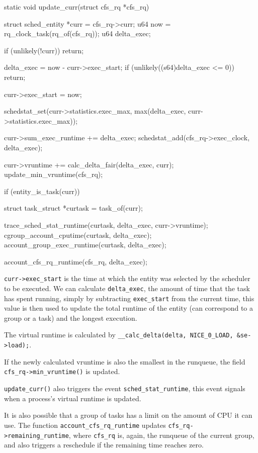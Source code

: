 \documentclass[10pt]{book}
\begin{document}
\begin{code}
static void update_curr(struct cfs_rq *cfs_rq)
{
	struct sched_entity *curr = cfs_rq->curr;
	u64 now = rq_clock_task(rq_of(cfs_rq));
	u64 delta_exec;

	if (unlikely(!curr))
		return;

	delta_exec = now - curr->exec_start;
	if (unlikely((s64)delta_exec <= 0))
		return;

	curr->exec_start = now;

	schedstat_set(curr->statistics.exec_max,
		      max(delta_exec, curr->statistics.exec_max));

	curr->sum_exec_runtime += delta_exec;
	schedstat_add(cfs_rq->exec_clock, delta_exec);

	curr->vruntime += calc_delta_fair(delta_exec, curr);
	update_min_vruntime(cfs_rq);

	if (entity_is_task(curr)) {
		struct task_struct *curtask = task_of(curr);

		trace_sched_stat_runtime(curtask, delta_exec, curr->vruntime);
		cgroup_account_cputime(curtask, delta_exec);
		account_group_exec_runtime(curtask, delta_exec);
	}

	account_cfs_rq_runtime(cfs_rq, delta_exec);
}
\end{code}

\verb|curr->exec_start| is the time at which the entity was selected by the scheduler to be executed. %
We can calculate \verb|delta_exec|, the amount of time that the task has spent running, simply by subtracting \verb|exec_start| from the current time, this value is then used to update the total runtime of the entity (can correspond to a group or a task) and the longest execution.

The virtual runtime is calculated by \newline \verb|__calc_delta(delta, NICE_0_LOAD, &se->load);|. %

If the newly calculated vruntime is also the smallest in the runqueue, the field \verb|cfs_rq->min_vruntime()| is updated.

\verb|update_curr()| also triggers the event \verb|sched_stat_runtime|\label{trace:sched_stat_runtime}, this event signals when a process's virtual runtime is updated.

It is also possible that a group of tasks has a limit on the amount of CPU it can use. The function \verb|account_cfs_rq_runtime| updates \newline \verb|cfs_rq->remaining_runtime|, where \verb|cfs_rq| is, again, the runqueue of the current group, and also triggers a reschedule if the remaining time reaches zero.
\end{document}
